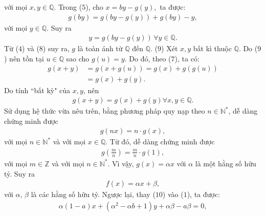 \begin{multicols}{2}
	với mọi $x,y \in \mathbb{Q}$.
	\vskip 0.05cm
	Trong ($5$), cho $x = by - g\left( y \right),$  ta được:
	\begin{align*}
		g\left( {by} \right) = g\left( {by - g\left( y \right)} \right) + g\left( {by} \right) - y,
	\end{align*}
	với mọi $y \in \mathbb{Q}$. Suy ra
	\begin{align*}
		y = g\left( {by - g\left( y \right)} \right)\,\forall y \in \mathbb{Q}. \tag{$8$}
	\end{align*}
	Từ ($4$) và ($8$) suy ra, $g$ là toàn ánh từ $\mathbb{Q}$ \linebreak đến  $\mathbb{Q}$. \hfill ($9$)
	\vskip 0.05cm
	Xét $x, y$ bất kì thuộc $\mathbb{Q}$.
	\vskip 0.05cm  
	Do ($9$) nên tồn tại $u \in \mathbb{Q}$  sao cho $g(u) = y$. Do đó, theo ($7$), ta có:
	\begin{align*}
		g\left( {x + y} \right) &= g\left( {x + g\left( u \right)} \right) = g\left( x \right) + g\left( {g\left( u \right)} \right) \\
		&= g\left( x \right) + g\left( y \right).
	\end{align*}
	Do tính ``bất kỳ" của $x, y$, nên
	\begin{align*}
		g\left( {x + y} \right) = g\left( x \right) + g\left( y \right)\forall x,y \in \mathbb{Q}.
	\end{align*}
	Sử dụng hệ thức vừa nêu trên, bằng phương pháp quy nạp theo $n \in \mathbb{N^*}$, dễ dàng chứng minh được
	\begin{align*}
		g\left( {nx} \right) = n \cdot g\left( x \right),
	\end{align*}
	với mọi $n \in \mathbb{N^*}$  và với mọi  $x \in \mathbb{Q}$.
	\vskip 0.05cm
	Từ đó, dễ dàng chứng minh được
	\begin{align*}
		g\left( {\frac{m}{n}} \right) = \frac{m}{n} \cdot g\left( 1 \right),
	\end{align*}
	với mọi $m \in \mathbb{Z}$  và với mọi $n \in \mathbb{N^*}$.
	\vskip 0.05cm 
	Vì vậy, $g(x) = \alpha x$  với $\alpha$  là một hằng số hữu tỷ.
	\vskip 0.05cm
	Suy ra
	\begin{align*}
		f\left( x \right) = \alpha x + \beta , \tag{$10$}
	\end{align*}     
	với $\alpha$, $\beta$  là các hằng số hữu tỷ.
	\vskip 0.05cm
	Ngược lại, thay ($10$) vào ($1$), ta được:
	\begin{align*}
		\alpha \left(\! {1 \!-\! a} \!\right)x \!+\! \left(\! {{\alpha ^2} \!-\! \alpha b \!+\! 1} \right)y \!+\! \alpha \beta  \!-\! a\beta  \!=\! 0, 

\end{align*}
\end{multicols}
